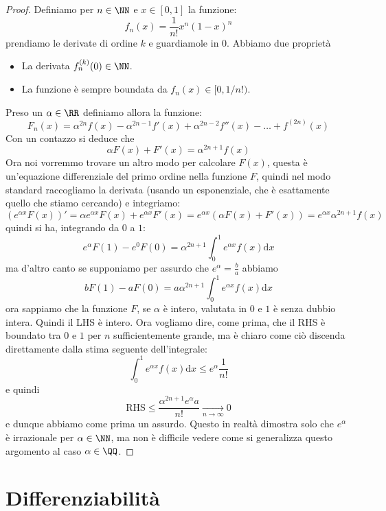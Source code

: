 \documentclass[11pt]{scrartcl}
\newcommand{\dif}{\text{d}}
\begin{document}
	 \begin{proof}
	 	Definiamo per $n\in\NN$ e $x\in [0,1]$ la funzione:
	 	$$f_n(x)=\frac{1}{n!}x^n(1-x)^n$$
	 	prendiamo le derivate di ordine $k$ e guardiamole in $0$. Abbiamo due proprietà
	 	\begin{itemize}
	 		\item  La derivata $f^{(k)}_n(0)\in\NN$.
	 		\item  La funzione è sempre boundata da $f_n(x)\in [0,1/n!)$.
	 	\end{itemize}
	 	Preso un $\alpha\in\RR$ definiamo allora la funzione:
	 	$$F_n(x)=\alpha^{2n}f(x)-\alpha^{2n-1}f'(x)+\alpha^{2n-2}f''(x)-\dots+f^{(2n)}(x)$$
	 	Con un contazzo si deduce che 
	 	$$\alpha F(x)+F'(x)=\alpha^{2n+1}f(x)$$
	 	Ora noi vorremmo trovare un altro modo per calcolare $F(x)$, questa è un'equazione differenziale del primo ordine nella funzione $F$, quindi nel modo standard raccogliamo la derivata (usando un esponenziale, che è esattamente quello che stiamo cercando) e integriamo:
	 	$$\left(e^{\alpha x}F(x)\right)'=\alpha e^{\alpha x}F(x)+e^{\alpha x}F'(x)=e^{\alpha x}(\alpha F(x)+F'(x))=e^{\alpha x}\alpha^{2n+1}f(x)$$
	 	quindi si ha, integrando da $0$ a $1$:
	 	$$e^\alpha F(1)-e^0F(0)=\alpha^{2n+1}\int_{0}^1e^{\alpha x}f(x)\dif x$$
	 	ma d'altro canto se supponiamo per assurdo che $e^\alpha=\frac{b}{a}$ abbiamo
	 	$$bF(1)-aF(0)=a\alpha^{2n+1}\int_{0}^{1}e^{\alpha x}f(x)\dif x$$
	 	ora sappiamo che la funzione $F$, se $\alpha$ è intero, valutata in $0$ e $1$ è senza dubbio intera. Quindi il LHS è intero. Ora vogliamo dire, come prima, che il RHS è boundato tra $0$ e $1$ per $n$ sufficientemente grande, ma è chiaro come ciò discenda direttamente dalla stima seguente dell'integrale:
	 	$$\int_{0}^{1}e^{\alpha x}f(x)\dif x\le e^\alpha \frac{1}{n!}$$
	 	e quindi
	 	$$\text{RHS}\le \frac{\alpha^{2n+1}e^\alpha a}{n!}\underset{n\to\infty}{\longrightarrow}0$$
	 	e dunque abbiamo come prima un assurdo. Questo in realtà dimostra solo che $e^\alpha$ è irrazionale per $\alpha\in\NN$, ma non è difficile vedere come si generalizza questo argomento al caso $\alpha\in\QQ$.
	 \end{proof}
	 
	 \newpage
	 
	 \section{Differenziabilità}
	 
\end{document}
